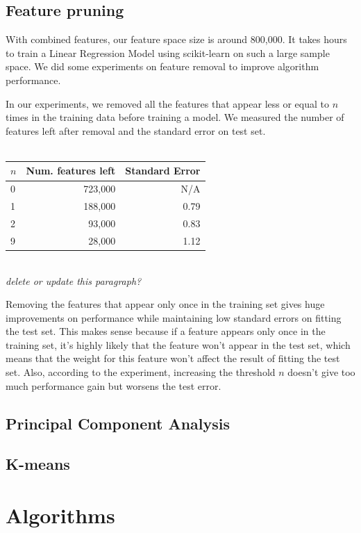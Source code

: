 \documentclass[journal]{IEEEtran}
\begin{document}
\subsection{Feature pruning}
With combined features, our feature space size is around 800,000. It takes hours to train a Linear Regression Model using scikit-learn \cite{scikit} on such a large sample space. We did some experiments on feature removal to improve algorithm performance.
\par In our experiments, we removed all the features that appear less or equal to $n$ times in the training data before training a model. We measured the number of features left after removal and the standard error on test set.\\
\\
\begin{tabular}{|l| r r|} %
\hline
$n$ & Num. features left & Standard Error  \\ [0.5ex] %
\hline
0 & 723,000 & N/A \\
1 & 188,000 & 0.79 \\
2 & 93,000  & 0.83 \\
9 & 28,000  & 1.12 \\ [1ex]
\hline %
\end{tabular}
\smallskip
\\
\textit{delete or update this paragraph?}
\par Removing the features that
appear only once in the training set gives huge improvements on performance
while maintaining low standard errors on fitting the test set. This makes sense
because if a
feature appears only once in the training set, it's highly likely that the
feature won't appear in the test set, which means that the weight for this feature
won't affect the result of fitting the test set. Also, according to the experiment,
increasing the threshold $n$ doesn't give too much performance gain but worsens
the test error.

\subsection{Principal Component Analysis}

\subsection{K-means}

\section{Algorithms}
\end{document}
